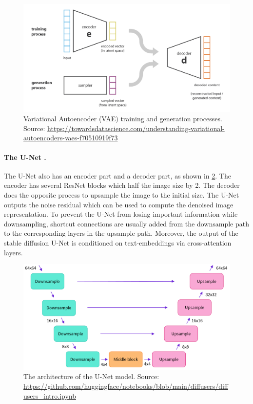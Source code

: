 \begin{figure}[ht]
    \centering
    \includegraphics[width=\linewidth]{images/vae.png}
    \caption{Variational Autoencoder (VAE) training and generation processes. Source: \url{https://towardsdatascience.com/understanding-variational-autoencoders-vaes-f70510919f73}}
    \label{fig:vae}
\end{figure}

\paragraph{The U-Net \cite{ronneberger2015u}.} The U-Net also has an encoder part and a decoder part, as shown in \cref{fig:unet_model}. The encoder has several ResNet blocks which half the image size by 2. The decoder does the opposite process to upsample the image to the initial size. The U-Net outputs the noise residual which can be used to compute the denoised image representation. To prevent the U-Net from losing important information while downsampling, shortcut connections are usually added from the downsample path to the corresponding layers in the upsample path. Moreover, the output of the stable diffusion U-Net is conditioned on text-embeddings via cross-attention layers.

\begin{figure}[ht]
    \centering
    \includegraphics[width=\linewidth]{images/unet-model.png}
    \caption{The architecture of the U-Net model. Source: \url{https://github.com/huggingface/notebooks/blob/main/diffusers/diffusers_intro.ipynb}}
    \label{fig:unet_model}
\end{figure}

